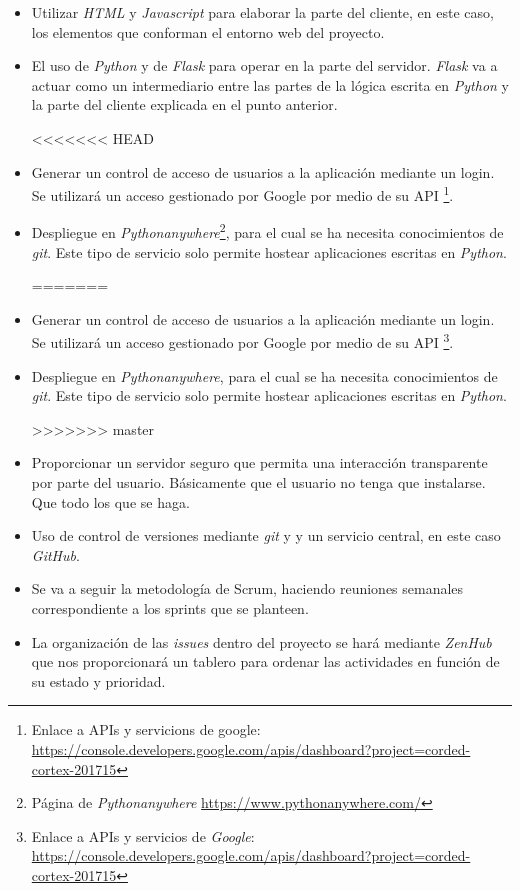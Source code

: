 \begin{itemize}
	\item Utilizar \textit{HTML} y \textit{Javascript} para elaborar la parte del cliente, en este caso, los elementos que conforman el entorno web del proyecto.
	
	\item El uso de \textit{Python} y de \textit{Flask} para operar en la parte del servidor. \textit{Flask} va a actuar como un intermediario entre las partes de la lógica escrita en \textit{Python} y la parte del cliente explicada en el punto anterior.
	
<<<<<<< HEAD
	\item Generar un control de acceso de usuarios a la aplicación mediante un login. Se utilizará un acceso gestionado por Google por medio de su API \footnote{Enlace a APIs y servicions de google: \url{https://console.developers.google.com/apis/dashboard?project=corded-cortex-201715}}.
	
	\item Despliegue en \textit{Pythonanywhere}\footnote{Página de \textit{Pythonanywhere} \url{https://www.pythonanywhere.com/}}, para el cual se ha necesita conocimientos de \textit{git}. Este tipo de servicio solo permite hostear aplicaciones escritas en \textit{Python}.
	
=======
	\item Generar un control de acceso de usuarios a la aplicación mediante un login. Se utilizará un acceso gestionado por Google por medio de su API \footnote{Enlace a APIs y servicios de \textit{Google}: \url{https://console.developers.google.com/apis/dashboard?project=corded-cortex-201715}}.
	
	\item Despliegue en \textit{Pythonanywhere}, para el cual se ha necesita conocimientos de \textit{git}. Este tipo de servicio solo permite hostear aplicaciones escritas en \textit{Python}.
	
>>>>>>> master
	\item Proporcionar un servidor seguro que permita una interacción transparente por parte del usuario. Básicamente que el usuario no tenga que instalarse. Que todo los que se haga.
	
	\item Uso de control de versiones mediante \textit{git} y y un servicio central, en este caso \textit{GitHub}.
	
	\item Se va a seguir la metodología de Scrum, haciendo reuniones semanales correspondiente a los sprints que se planteen. 
	
	\item La organización de las \textit{issues} dentro del proyecto se hará mediante \textit{ZenHub} que nos proporcionará un tablero para ordenar las actividades en función de su estado y prioridad.
	
\end{itemize}